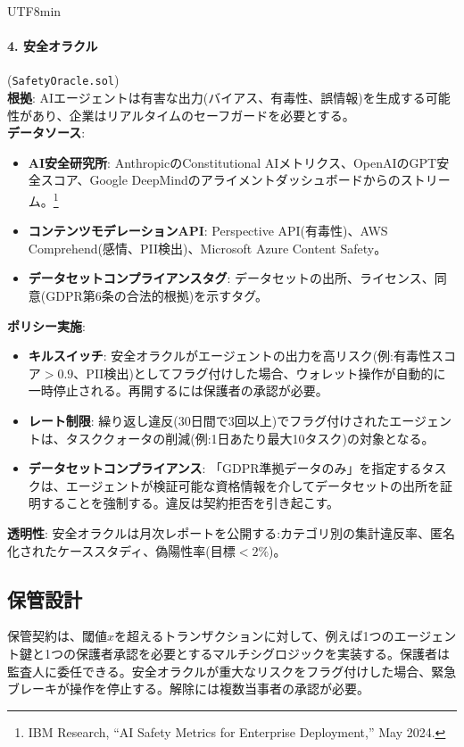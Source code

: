 \documentclass[11pt]{article}
\begin{document}
\begin{CJK}{UTF8}{min}
\paragraph{4. 安全オラクル} (\texttt{SafetyOracle.sol})\\
\textbf{根拠}: AIエージェントは有害な出力(バイアス、有毒性、誤情報)を生成する可能性があり、企業はリアルタイムのセーフガードを必要とする。\\
\textbf{データソース}:
\begin{itemize}[noitemsep]
  \item \textbf{AI安全研究所}: AnthropicのConstitutional AIメトリクス、OpenAIのGPT安全スコア、Google DeepMindのアライメントダッシュボードからのストリーム。\footnote{IBM Research, ``AI Safety Metrics for Enterprise Deployment,'' May 2024.}
  \item \textbf{コンテンツモデレーションAPI}: Perspective API(有毒性)、AWS Comprehend(感情、PII検出)、Microsoft Azure Content Safety。
  \item \textbf{データセットコンプライアンスタグ}: データセットの出所、ライセンス、同意(GDPR第6条の合法的根拠)を示すタグ。
\end{itemize}
\textbf{ポリシー実施}:
\begin{itemize}[noitemsep]
  \item \textbf{キルスイッチ}: 安全オラクルがエージェントの出力を高リスク(例:有毒性スコア$>0.9$、PII検出)としてフラグ付けした場合、ウォレット操作が自動的に一時停止される。再開するには保護者の承認が必要。
  \item \textbf{レート制限}: 繰り返し違反(30日間で3回以上)でフラグ付けされたエージェントは、タスククォータの削減(例:1日あたり最大10タスク)の対象となる。
  \item \textbf{データセットコンプライアンス}: 「GDPR準拠データのみ」を指定するタスクは、エージェントが検証可能な資格情報を介してデータセットの出所を証明することを強制する。違反は契約拒否を引き起こす。
\end{itemize}
\textbf{透明性}: 安全オラクルは月次レポートを公開する:カテゴリ別の集計違反率、匿名化されたケーススタディ、偽陽性率(目標$<2\%$)。

\subsection{保管設計}
保管契約は、閾値$x$を超えるトランザクションに対して、例えば1つのエージェント鍵と1つの保護者承認を必要とするマルチシグロジックを実装する。保護者は監査人に委任できる。安全オラクルが重大なリスクをフラグ付けした場合、緊急ブレーキが操作を停止する。解除には複数当事者の承認が必要。


\end{CJK}
\end{document}
